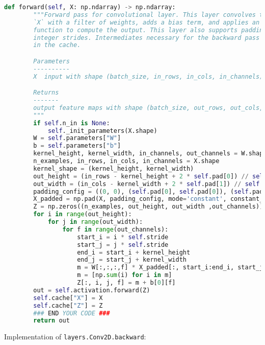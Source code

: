 \begin{lstlisting}[language=Python]
    def forward(self, X: np.ndarray) -> np.ndarray:
        """Forward pass for convolutional layer. This layer convolves the input
        `X` with a filter of weights, adds a bias term, and applies an activation
        function to compute the output. This layer also supports padding and
        integer strides. Intermediates necessary for the backward pass are stored
        in the cache.

        Parameters
        ----------
        X  input with shape (batch_size, in_rows, in_cols, in_channels)

        Returns
        -------
        output feature maps with shape (batch_size, out_rows, out_cols, out_channels)
        """
        if self.n_in is None:
            self._init_parameters(X.shape)
        W = self.parameters["W"]
        b = self.parameters["b"]
        kernel_height, kernel_width, in_channels, out_channels = W.shape
        n_examples, in_rows, in_cols, in_channels = X.shape
        kernel_shape = (kernel_height, kernel_width)
        out_height = (in_rows - kernel_height + 2 * self.pad[0]) // self.stride + 1
        out_width = (in_cols - kernel_width + 2 * self.pad[1]) // self.stride + 1
        padding_config = ((0, 0), (self.pad[0], self.pad[0]), (self.pad[1], self.pad[1]), (0, 0))
        X_padded = np.pad(X, padding_config, mode='constant', constant_values=0)
        Z = np.zeros((n_examples, out_height, out_width ,out_channels))
        for i in range(out_height):
            for j in range(out_width):
                for f in range(out_channels):
                    start_i = i * self.stride
                    start_j = j * self.stride
                    end_i = start_i + kernel_height
                    end_j = start_j + kernel_width                    
                    m = W[:,:,:,f] * X_padded[:, start_i:end_i, start_j:end_j, :]
                    m = [np.sum(i) for i in m]
                    Z[:, i, j, f] = m + b[0][f]
        out = self.activation.forward(Z)
        self.cache["X"] = X
        self.cache["Z"] = Z
        ### END YOUR CODE ###
        return out

\end{lstlisting}

Implementation of \texttt{layers.Conv2D.backward}:

